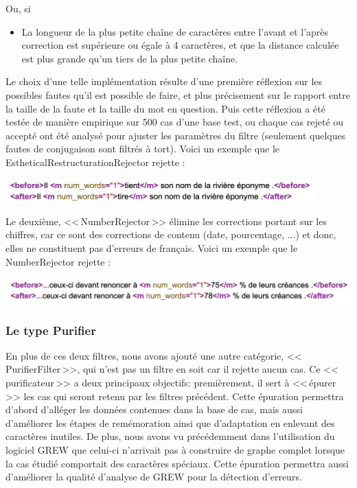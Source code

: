 \documentclass[11pt]{article}
\begin{document}
Ou, si
\begin{itemize}
\item La longueur de la plus petite cha\^{i}ne de caract\`{e}res entre l'avant et l'apr\`{e}s correction est sup\'{e}rieure ou \'{e}gale \`{a} 4 caract\`{e}res, et que la distance calcul\'{e}e est plus grande qu'un tiers de la plus petite cha\^{i}ne.
\end{itemize}
 Le choix d'une telle impl\'{e}mentation r\'{e}sulte d'une premi\`{e}re r\'{e}flexion sur les possibles fautes qu'il est possible de faire, et plus pr\'{e}cisement sur le rapport entre la taille de la faute et la taille du mot en question. Puis cette r\'{e}flexion a \'{e}t\'{e} test\'{e}e de mani\`{e}re empirique sur 500 cas d'une base test, ou chaque cas rejet\'{e} ou accept\'{e} ont \'{e}t\'{e} analys\'{e} pour ajuster les param\`{e}tres du filtre (seulement quelques fautes de conjugaison sont filtr\'{e}s \`{a} tort).
 Voici un exemple que le EstheticalRestructurationRejector rejette :

\begin{center}
\includegraphics[width=12cm]{exemple12.png} %
\end{center}
Le deuxi\`{e}me, <<\,NumberRejector\,>> \'{e}limine les corrections portant sur les chiffres, car ce sont des corrections de contenu (date, pourcentage, ...) et donc, elles ne constituent pas d'erreurs de fran\c{c}ais. 
Voici un exemple que le NumberRejector rejette :
\begin{center}
\includegraphics[width=14cm]{exemple13.png} %
\end{center}

\subsubsection{Le type Purifier}
En plus de ces deux filtres, nous avons ajout\'{e} une autre cat\'{e}gorie, <<\,PurifierFilter\,>>, qui n'est pas un filtre en soit car il rejette aucun cas. Ce <<\,purificateur\,>> a deux principaux objectifs: premi\`{e}rement, il sert \`{a} <<\,\'{e}purer\,>> les cas qui seront retenu par les filtres pr\'{e}c\'{e}dent. Cette \'{e}puration permettra d'abord d'all\'{e}ger les donn\'{e}es contenues dans la base de cas, mais aussi d'am\'{e}liorer les \'{e}tapes de rem\'{e}moration ainsi que d'adaptation en enlevant des caract\`{e}res inutiles. De plus, nous avons vu pr\'{e}c\'{e}demment dans l'utilisation du logiciel GREW que celui-ci n'arrivait pas \`{a} construire de graphe complet lorsque la cas \'{e}tudi\'{e} comportait des caract\`{e}res sp\'{e}ciaux. Cette \'{e}puration permettra aussi d'am\'{e}liorer la qualit\'{e} d'analyse de GREW pour la d\'{e}tection d'erreurs.
\end{document}
